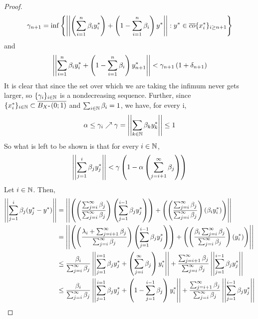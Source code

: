 \begin{lem}
\begin{proof}
        \begin{equation}
            \gamma_{n+1}=\inf\left\{ \left|\left| \left( \sum_{i=1}^n \beta_i y_i^*\right)+ \left( 1-\sum_{i=1}^n \beta_i\right)y^* \right|\right|: y^* \in \overline{co}\{x_i^*\}_{i \geq {n+1}}\right\}
        \end{equation}
        and 
        \begin{equation}\left|\left| \sum_{i=1}^n \beta_i y_i^* + \left(  1- \sum_{i=1}^n \beta_i \right) y_{n+1}^* \right|\right| < \gamma_{n+1} \left( 1+\delta_{n+1}\right)
        \end{equation}
        It is clear that since the set over which we are taking the infimum never gets larger, so $\{\gamma_i\}_{i \in \mathbb{N}}$ is a nondecreasing sequence. Further, since $\{x_i^*\}_{i \in \mathbb{N}} \subset \overline{B_{X^*}(0;1)}$ and $\sum_{i \in \mathbb{N}} \beta_i=1$, we have, for every i, 
        \begin{equation}
            \alpha \leq \gamma_i \nearrow \gamma = \left|\left| \sum_{k \in \mathbb{N}} \beta_k y_k^* \right|\right| \leq 1
        \end{equation}
        So what is left to be shown is that for every $i \in \mathbb{N}$, 
        \begin{equation}
            \left|\left| \sum_{j=1}^i \beta_j y_j^* \right|\right| < \gamma \left( 1-\alpha \left(  \sum_{j=i+1}^\infty \beta_j\right)\right)
        \end{equation}
        Let $i \in \mathbb{N}$. Then, 
        \begin{equation}
            \begin{split}
                \norm{\sum_{j=1}^i \beta_j (y_j^*-y^*)} & = \norm{ \pa{\pa{ \frac{\sum_{j=i}^\infty \beta_j}{\sum_{j=i}^\infty \beta_j}} \pa{\sum_{j=1}^{i-1} \beta_j y_j^*}}+ \pa{\pa{ \frac{\sum_{j=i}^\infty \beta_j}{\sum_{j=i}^\infty \beta_j}}\pa{\beta_i y_i^*}}}\\
                & = \norm{ \pa{\pa{ \frac{\lambda_i+\sum_{j=i+1}^\infty \beta_j}{\sum_{j=i}^\infty \beta_j}} \pa{\sum_{j=1}^{i-1} \beta_j y_j^*}}+ \pa{\pa{ \frac{\beta_i\sum_{j=i}^\infty \beta_j}{\sum_{j=i}^\infty \beta_j}}\pa{ y_i^*}}}\\
                & \leq \frac{\beta_i}{\sum_{j=i}^{\infty} \beta_j} \norm{ \sum_{j=1}^{i=1} \beta_j y_j^*+ \pa{ \sum_{j=i}^\infty \beta_j} y_i^*}+ \frac{\sum_{j=i+1}^{\infty} \beta_j}{\sum_{j=i}^{\infty} \beta_j} \norm{\sum_{j=1}^{i-1} \beta_j y_j^*}\\
                & \leq \frac{\beta_i}{\sum_{j=i}^{\infty} \beta_j} \norm{ \sum_{j=1}^{i=1} \beta_j y_j^*+ \pa{ 1-\sum_{j=1}^{i-1} \beta_j} y_i^*}+ \frac{\sum_{j=i+1}^{\infty} \beta_j}{\sum_{j=i}^{\infty} \beta_j} \norm{\sum_{j=1}^{i-1} \beta_j y_j^*}\\

\end{split}
\end{equation}
\end{proof}
\end{lem}
